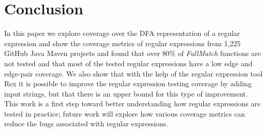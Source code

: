 \section{Conclusion}
\label{sec:conclusion}
In this paper we explore coverage over the DFA representation of a regular expression and show the coverage metrics of regular expressions from 1,225 GitHub Java Maven projects and found that over 80\% of {\em FullMatch} functions are not tested and that most of the tested regular expressions have a low edge and edge-pair coverage. 
We also show that with the help of the regular expression tool Rex it is possible to improve the regular expression testing coverage by adding input strings, but that there is an upper bound for this type of improvement. 
This work is a first step toward better understanding how regular expressions are tested in practice; future work will explore how various coverage metrics can reduce the bugs associated with regular expressions. %



